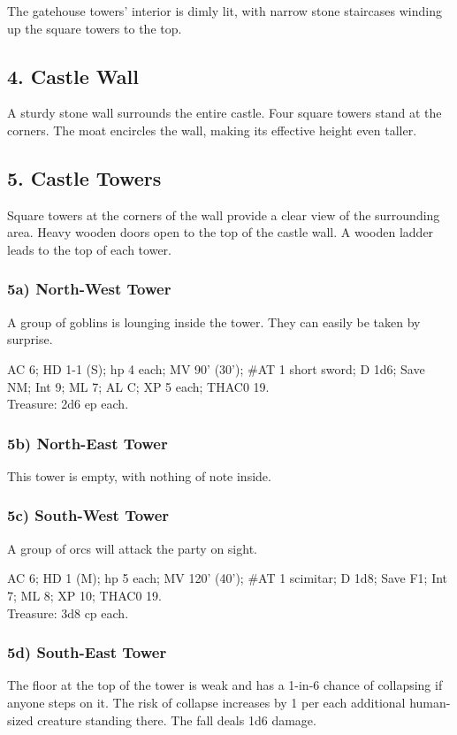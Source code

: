 \documentclass[english,12pt,openany,letterpaper]{book}
\begin{document}
The gatehouse towers' interior is dimly lit, with narrow stone staircases winding up the square towers to the top.

\subsection{4. Castle Wall}

A sturdy stone wall surrounds the entire castle. Four square towers stand at the corners. The moat encircles the wall, making its effective height even taller.

\break

\subsection{5. Castle Towers}

Square towers at the corners of the wall provide a clear view of the surrounding area. Heavy wooden doors open to the top of the castle wall. A wooden ladder leads to the top of each tower.

\subsubsection{5a) North-West Tower}

A group of goblins is lounging inside the tower. They can easily be taken by surprise.

AC 6; HD 1-1 (S); hp 4 each; MV 90' (30'); \#AT 1 short sword; D 1d6; Save NM; Int 9; ML 7; AL C; XP 5 each; THAC0 19.
\\Treasure: 2d6 ep each.

\subsubsection{5b) North-East Tower}

This tower is empty, with nothing of note inside.

\subsubsection{5c) South-West Tower}

A group of orcs will attack the party on sight.

AC 6; HD 1 (M); hp 5 each; MV 120' (40'); \#AT 1 scimitar; D 1d8; Save F1; Int 7; ML 8; XP 10; THAC0 19.
\\Treasure: 3d8 cp each.

\subsubsection{5d) South-East Tower}

The floor at the top of the tower is weak and has a 1-in-6 chance of collapsing if anyone steps on it. The risk of collapse increases by 1 per each additional human-sized creature standing there. The fall deals 1d6 damage.

\clearpage
\end{document}
